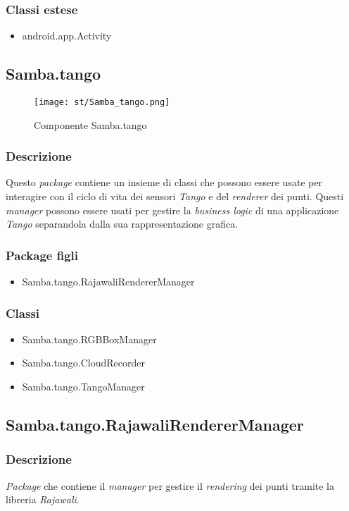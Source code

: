 \subsubsection{Classi estese}
\begin{itemize}
	\item android.app.Activity
\end{itemize}

\subsection{Samba.tango}\label{subs:samba-tango}
\begin{figure}[!h] 
    \centering 
    \texttt{[image: st/Samba\_tango.png]} 
    \caption{Componente Samba.tango}
\end{figure}
\subsubsection{Descrizione}
Questo \emph{package} contiene un insieme di classi che possono essere usate per interagire con il ciclo di vita dei sensori \emph{Tango} e del \emph{renderer} dei punti. Questi \emph{manager} possono essere usati per gestire la \emph{business logic} di una applicazione \emph{Tango} separandola dalla sua rappresentazione grafica.
\subsubsection{Package figli}
\begin{itemize}
	\item Samba.tango.RajawaliRendererManager
\end{itemize}
\subsubsection{Classi}
\begin{itemize}
	\item Samba.tango.RGBBoxManager
	\item Samba.tango.CloudRecorder
	\item Samba.tango.TangoManager
\end{itemize}

\subsection{Samba.tango.RajawaliRendererManager}
\subsubsection{Descrizione}
\emph{Package} che contiene il \emph{manager} per gestire il \emph{rendering} dei punti tramite la libreria \emph{Rajawali}.
